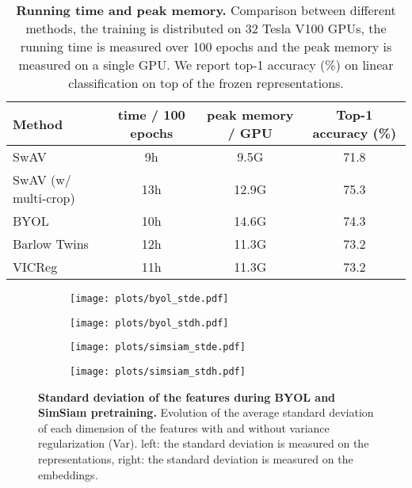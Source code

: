 \documentclass{article}
\newcommand{\algo}{VICReg}
\begin{document}
\begin{table}[h]
\caption{\textbf{Running time and peak memory.} Comparison between different methods, the training is distributed on 32 Tesla V100 GPUs, the running time is measured over 100 epochs and the peak memory is measured on a single GPU. We report top-1 accuracy (\%) on linear classification on top of the frozen representations.}
\vspace{-6mm}
\label{tab:running_time}
\vskip 0.15in
\begin{center}
\begin{tabular}{lccc}
\toprule
Method & time / 100 epochs & peak memory / GPU & Top-1 accuracy (\%) \\
\midrule
SwAV                        &   9h      &   9.5G    & 71.8 \\
SwAV (w/ multi-crop)        &   13h     &   12.9G   & 75.3 \\
BYOL                        &   10h     &   14.6G   & 74.3 \\
Barlow Twins                &   12h     &   11.3G   & 73.2 \\
\algo                       &   11h     &   11.3G   & 73.2 \\
\bottomrule
\end{tabular}
\end{center}
\end{table}

\newpage
\setcounter{figure}{2}

\begin{figure}[b]
\centering
\hspace{-4em}
\begin{subfigure}{.4\textwidth}
    \centering
    \texttt{[image: plots/byol\_stde.pdf]}
\end{subfigure}\hspace{5em}
\begin{subfigure}{.4\textwidth}
    \centering
    \texttt{[image: plots/byol\_stdh.pdf]}
\end{subfigure}
\end{figure}
\begin{figure}[b]
\vspace{-3em}
\centering
\hspace{-4em}
\begin{subfigure}{.4\textwidth}
    \centering
    \texttt{[image: plots/simsiam\_stde.pdf]}
\end{subfigure}\hspace{5em}
\begin{subfigure}{.4\textwidth}
    \centering
    \texttt{[image: plots/simsiam\_stdh.pdf]}
\end{subfigure}
\caption{\textbf{Standard deviation of the features during BYOL and SimSiam pretraining.} Evolution of the average standard deviation of each dimension of the features with and without variance regularization (Var). left: the standard deviation is measured on the representations, right: the standard deviation is measured on the embeddings.}
\label{fig:std}
\end{figure}
\end{document}
